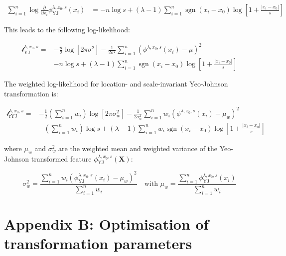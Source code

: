 \documentclass[
  a4paper,
]{article}
\DeclareMathOperator{\sgn}{sgn}
\begin{document}
\begin{equation}
\begin{split}
\sum_{i=1}^n \log \frac{\partial}{\partial x_i} \phi_{\text{YJ}}^{\lambda, x_0, s}(x_i) & = - n \log s + (\lambda - 1) \sum_{i=1}^n \sgn(x_i - x_0) \log \left[1 + \frac{|x_i - x_0|}{s} \right]
\end{split}
\end{equation}

This leads to the following log-likelihood:

\begin{equation}
\begin{split}
\mathcal{l}_{\text{YJ}}^{\lambda, x_0, s} = & -\frac{n}{2} \log\left[2 \pi \sigma^2\right] -\frac{1}{2 \sigma^2} \sum_{i=1}^n \left( \phi^{\lambda, x_0, s}(x_i) - \mu \right)^2 \\
& - n \log s + (\lambda - 1) \sum_{i=1}^n \sgn(x_i - x_0) \log \left[1 + \frac{|x_i - x_0|}{s} \right]
\end{split}
\end{equation}

The weighted log-likelihood for location- and scale-invariant
Yeo-Johnson transformation is:

\begin{equation}
\begin{split}
\mathcal{l}_{\text{rYJ}}^{\lambda, x_0, s} = & -\frac{1}{2} \left(\sum_{i=1}^n w_i \right) \log \left[ 2 \pi \sigma_w^2 \right] -\frac{1}{2 \sigma_w^2} \sum_{i=1}^n w_i \left( \phi^{\lambda, x_0, s}(x_i) - \mu_w \right)^2 \\
& - \left( \sum_{i=1}^n w_i \right) \log s + (\lambda - 1) \sum_{i=1}^n w_i \sgn(x_i - x_0) \log \left[1 + \frac{|x_i - x_0|}{s} \right]
\end{split}
\end{equation}

where \(\mu_w\) and \(\sigma^2_w\) are the weighted mean and weighted
variance of the Yeo-Johnson transformed feature
\(\phi_{\text{YJ}}^{\lambda, x_0, s} (\mathbf{X})\):

\begin{equation}
\sigma_w^2 = \frac{\sum_{i=1}^n w_i \left(\phi_{\text{YJ}}^{\lambda, x_0, s} (x_i) - \mu_w \right)^2}{\sum_{i=1}^n w_i} \quad \text{with } \mu_w = \frac{\sum_{i=1}^n \phi_{\text{YJ}}^{\lambda, x_0, s} (x_i)} {\sum_{i=1}^n w_i}
\end{equation}

\section{Appendix B: Optimisation of transformation
parameters}\label{appendix-b-optimisation-of-transformation-parameters}
\end{document}
